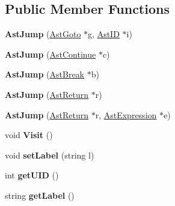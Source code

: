 \subsection*{Public Member Functions}
\begin{DoxyCompactItemize}
\item 
\hypertarget{classAstJump_a83a4aa905d84f3602374029976d99412}{{\bfseries Ast\-Jump} (\hyperlink{classAstGoto}{Ast\-Goto} $\ast$g, \hyperlink{classAstID}{Ast\-I\-D} $\ast$i)}\label{classAstJump_a83a4aa905d84f3602374029976d99412}

\item 
\hypertarget{classAstJump_a945a1bdc268bfa7f1fdd9f4d39bdef1a}{{\bfseries Ast\-Jump} (\hyperlink{classAstContinue}{Ast\-Continue} $\ast$c)}\label{classAstJump_a945a1bdc268bfa7f1fdd9f4d39bdef1a}

\item 
\hypertarget{classAstJump_a8b9e461b6a974f01889e89728afc7014}{{\bfseries Ast\-Jump} (\hyperlink{classAstBreak}{Ast\-Break} $\ast$b)}\label{classAstJump_a8b9e461b6a974f01889e89728afc7014}

\item 
\hypertarget{classAstJump_a083525b758ad6e931aee5ac850592730}{{\bfseries Ast\-Jump} (\hyperlink{classAstReturn}{Ast\-Return} $\ast$r)}\label{classAstJump_a083525b758ad6e931aee5ac850592730}

\item 
\hypertarget{classAstJump_ad80d35d23849aa369fef153fef4bb99e}{{\bfseries Ast\-Jump} (\hyperlink{classAstReturn}{Ast\-Return} $\ast$r, \hyperlink{classAstExpression}{Ast\-Expression} $\ast$e)}\label{classAstJump_ad80d35d23849aa369fef153fef4bb99e}

\item 
\hypertarget{classAstJump_aca65cbe034ffdb439f6e3c73e40550ae}{void {\bfseries Visit} ()}\label{classAstJump_aca65cbe034ffdb439f6e3c73e40550ae}

\item 
\hypertarget{classAST_a71d680856e95ff89f55d5311a552eba6}{void {\bfseries set\-Label} (string l)}\label{classAST_a71d680856e95ff89f55d5311a552eba6}

\item 
\hypertarget{classAST_ab7a5b1d9f1c2de0d98deb356f724a42c}{int {\bfseries get\-U\-I\-D} ()}\label{classAST_ab7a5b1d9f1c2de0d98deb356f724a42c}

\item 
\hypertarget{classAST_aee029be902fffc927d16ccb03eb922ad}{string {\bfseries get\-Label} ()}\label{classAST_aee029be902fffc927d16ccb03eb922ad}

\end{DoxyCompactItemize}
